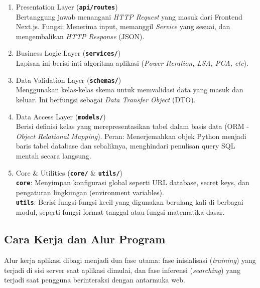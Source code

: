 \documentclass[12pt,a4paper]{article}
\begin{document}
\begin{enumerate}
    \item Presentation Layer (\textbf{\texttt{api/routes}})\\ Bertanggung jawab menangani \textit{HTTP Request} yang masuk dari Frontend Next.js. Fungsi: Menerima input, memanggil \textit{Service} yang sesuai, dan mengembalikan \textit{HTTP Response} (JSON).
    \item Business Logic Layer (\textbf{\texttt{services/}})\\ Lapisan ini berisi inti algoritma aplikasi (\textit{Power Iteration, LSA, PCA, etc}).
    \item Data Validation Layer (\textbf{\texttt{schemas/}})\\ Menggunakan kelas-kelas skema untuk memvalidasi data yang masuk dan keluar. Ini berfungsi sebagai \textit{Data Transfer Object} (DTO).
    \item Data Access Layer (\textbf{\texttt{models/}})\\ Berisi definisi kelas yang merepresentasikan tabel dalam basis data (ORM - \textit{Object Relational Mapping}). Peran: Menerjemahkan objek Python menjadi baris tabel database dan sebaliknya, menghindari penulisan query SQL mentah secara langsung.
    \item Core \& Utilities (\textbf{\texttt{core/}} \& \textbf{\texttt{utils/}})\\ \textbf{\texttt{core}}: Menyimpan konfigurasi global seperti URL database, secret keys, dan pengaturan lingkungan (environment variables).\\ \textbf{\texttt{utils}}: Berisi fungsi-fungsi kecil yang digunakan berulang kali di berbagai modul, seperti fungsi format tanggal atau fungsi matematika dasar.
\end{enumerate}

\subsection{Cara Kerja dan Alur Program}
Alur kerja aplikasi dibagi menjadi dua fase utama: fase inisialisasi (\textit{training}) yang terjadi di sisi server saat aplikasi dimulai, dan fase inferensi (\textit{searching}) yang terjadi saat pengguna berinteraksi dengan antarmuka web.
\end{document}
